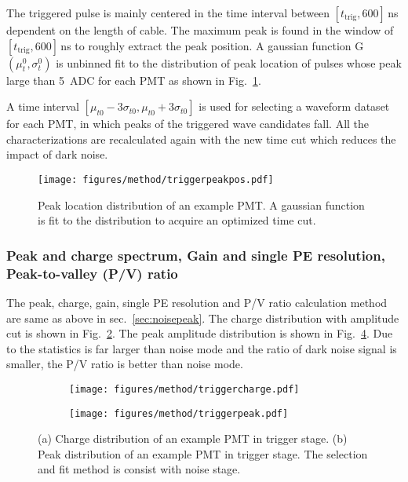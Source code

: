 The triggered pulse is mainly centered in the time interval between $[t_{\mathrm{trig}}, 600]$\,ns dependent on the length of cable. The maximum peak is found in the window of $[t_{\mathrm{trig}}, 600]$\,ns to roughly extract the peak position. A gaussian function G$(\mu_t^0,\sigma_t^0)$ is unbinned fit to the distribution of peak location of pulses whose peak large than \SI{5}{ADC} for each PMT as shown in Fig.~\ref{fig:peaklocation}.

A time interval $[\mu_{t0}-3\sigma_{t0}, \mu_{t0}+3\sigma_{t0}]$ is used for selecting a waveform dataset for each PMT, in which peaks of the triggered wave candidates fall. All the characterizations are recalculated again with the new time cut which reduces the impact of dark noise.

\begin{figure}[!htbp]
    \centering
    \texttt{[image: figures/method/triggerpeakpos.pdf]}
    \caption{Peak location distribution of an example PMT. A gaussian function is fit to the distribution to acquire an optimized time cut.}%
    \label{fig:peaklocation}
\end{figure}

\subsubsection{Peak and charge spectrum, Gain and single PE resolution, Peak-to-valley (P/V) ratio}
\label{sec:triggerpeak}
The peak, charge, gain, single PE resolution and P/V ratio calculation method are same as above in sec.~\ref{sec:noisepeak}. The charge distribution with amplitude cut is shown in Fig.~\ref{fig:triggercharge}. The peak amplitude distribution is shown in Fig.~\ref{fig:triggerpeak}. Due to the statistics is far larger than noise mode and the ratio of dark noise signal is smaller, the P/V ratio is better than noise mode.
\begin{figure}[!htbp]
    \centering
    \begin{subfigure}[b]{0.49\textwidth}
        \texttt{[image: figures/method/triggercharge.pdf]}
        \caption{}%
        \label{fig:triggercharge}
    \end{subfigure}
    \begin{subfigure}[b]{0.49\textwidth}
        \texttt{[image: figures/method/triggerpeak.pdf]}
        \caption{}%
        \label{fig:triggerpeak}
    \end{subfigure}
    \caption{(a) Charge distribution of an example PMT in trigger stage. (b) Peak distribution of an example PMT in trigger stage. The selection and fit method is consist with noise stage.}
\end{figure}

